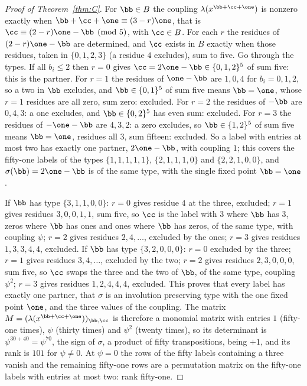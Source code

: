 \begin{proof}[Proof of Theorem~\ref{thm:C}]
For $\bb\in B$ the coupling $\lambda(x^{\bb+\cc+\one})$ is nonzero exactly
when $\bb+\cc+\one\equiv(3-r)\one$, that is $\cc\equiv(2-r)\one-\bb\pmod5$,
with $\cc\in B$. For each $r$ the residues of $(2-r)\one-\bb$ are
determined, and $\cc$ exists in $B$ exactly when those residues, taken in
$\{0,1,2,3\}$ (a residue $4$ excludes), sum to five. Go through the types.
If all $b_i\le2$ then $r=0$ gives $\cc=2\one-\bb\in\{0,1,2\}^5$ of sum five:
this is the partner. For $r=1$ the residues of $\one-\bb$ are $1,0,4$ for
$b_i=0,1,2$, so a two in $\bb$ excludes, and $\bb\in\{0,1\}^5$ of sum five
means $\bb=\one$, whose $r=1$ residues are all zero, sum zero: excluded. For
$r=2$ the residues of $-\bb$ are $0,4,3$: a one excludes, and $\bb\in\{0,2\}^5$
has even sum: excluded. For $r=3$ the residues of $-\one-\bb$ are $4,3,2$: a
zero excludes, so $\bb\in\{1,2\}^5$ of sum five means $\bb=\one$, residues
all $3$, sum fifteen: excluded. So a label with entries at most two has
exactly one partner, $2\one-\bb$, with coupling $1$; this covers the
fifty-one labels of the types $\{1,1,1,1,1\}$, $\{2,1,1,1,0\}$ and
$\{2,2,1,0,0\}$, and $\sigma(\bb)=2\one-\bb$ is of the same type, with the
single fixed point $\bb=\one$.

If $\bb$ has type $\{3,1,1,0,0\}$: $r=0$ gives residue $4$ at the three,
excluded; $r=1$ gives residues $3,0,0,1,1$, sum five, so $\cc$ is the label
with $3$ where $\bb$ has $3$, zeros where $\bb$ has ones and ones where
$\bb$ has zeros, of the same type, with coupling $\psi$; $r=2$ gives
residues $2,4,\dots$, excluded by the ones; $r=3$ gives residues $1,3,3,4,4$,
excluded. If $\bb$ has type $\{3,2,0,0,0\}$: $r=0$ excluded by the three;
$r=1$ gives residues $3,4,\dots$, excluded by the two; $r=2$ gives residues
$2,3,0,0,0$, sum five, so $\cc$ swaps the three and the two of $\bb$, of the
same type, coupling $\psi^2$; $r=3$ gives residues $1,2,4,4,4$, excluded.
This proves that every label has exactly one partner, that
$\sigma$ is an involution preserving type with the one fixed point $\one$,
and the three values of the coupling. The matrix $M=(\lambda(x^{\bb+\cc+
\one}))_{\bb,\cc}$ is therefore a monomial matrix with entries $1$ (fifty-one
times), $\psi$ (thirty times) and $\psi^2$ (twenty times), so its
determinant is $\psi^{30+40}=\psi^{70}$, the sign of $\sigma$, a product of
fifty transpositions, being $+1$, and its rank is $101$ for
$\psi\ne0$. At $\psi=0$ the rows of the fifty labels containing a three
vanish and the remaining fifty-one rows are a permutation matrix on the
fifty-one labels with entries at most two: rank fifty-one.


\end{proof}
